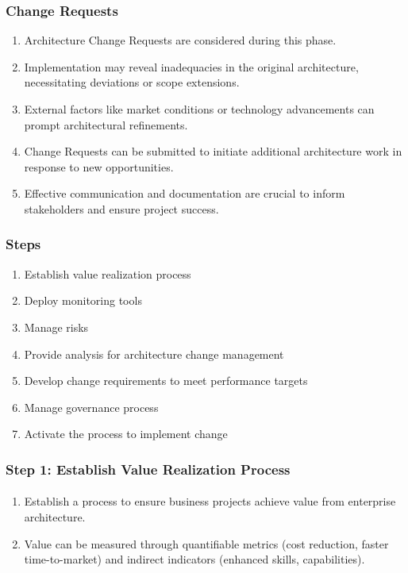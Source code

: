 \documentclass[aspectratio=169, table]{beamer}
\begin{document}
	\begin{frame}
		\frametitle{Change Requests}
		\vspace{20pt}
		\begin{enumerate}
			\item Architecture Change Requests are considered during this phase.

			\item Implementation may reveal inadequacies in the original architecture, necessitating deviations or scope extensions.

			\item External factors like market conditions or technology advancements can prompt architectural refinements.

			\item Change Requests can be submitted to initiate additional architecture work in response to new opportunities.

			\item Effective communication and documentation are crucial to inform stakeholders and ensure project success.
		\end{enumerate}


	\end{frame}

	\begin{frame}
		\frametitle{Steps}
		\vspace{20pt}
		\begin{enumerate}
			\item Establish value realization process
			\item Deploy monitoring tools
			\item Manage risks
			\item Provide analysis for architecture change management
			\item Develop change requirements to meet performance targets
			\item Manage governance process
			\item Activate the process to implement change
		\end{enumerate}
	\end{frame}

	\begin{frame}
		\frametitle{Step 1: Establish Value Realization Process}
		\framesubtitle{\hspace{1cm}}
		\vspace{20pt}
		\begin{enumerate}
			\item Establish a process to ensure business projects achieve value from enterprise architecture.

			\item Value can be measured through quantifiable metrics (cost reduction, faster time-to-market) and indirect indicators (enhanced skills, capabilities).
		\end{enumerate}

	\end{frame}
\end{document}
